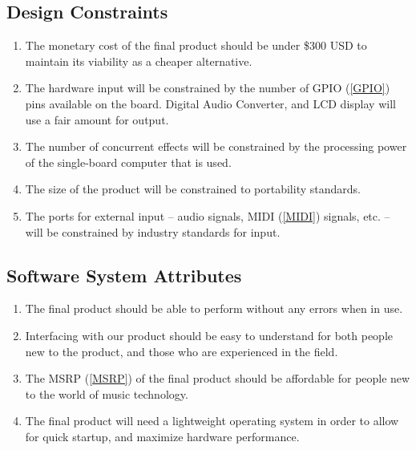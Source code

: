\subsection{Design Constraints}
    \begin{enumerate}[label=\alph*.]
        \item The monetary cost of the final product should be under \$300 USD to maintain its viability as a cheaper alternative.
        \item The hardware input will be constrained by the number of GPIO (\ref{GPIO}) pins available on the board. Digital Audio Converter, and LCD display will use a fair amount for output.
        \item The number of concurrent effects will be constrained by the processing power of the single-board computer that is used.
        \item The size of the product will be constrained to portability standards.
        \item The ports for external input -- audio signals, MIDI (\ref{MIDI}) signals, etc. -- will be constrained by industry standards for input.
    \end{enumerate}

\subsection{Software System Attributes}
    \begin{enumerate}[label=\alph*.]
        \item The final product should be able to perform without any errors when in use.
        \item Interfacing with our product should be easy to understand for both people new to the product, and those who are experienced in the field.
        \item The MSRP (\ref{MSRP}) of the final product should be affordable for people new to the world of music technology.
        \item The final product will need a lightweight operating system in order to allow for quick startup, and maximize hardware performance.
    \end{enumerate}

